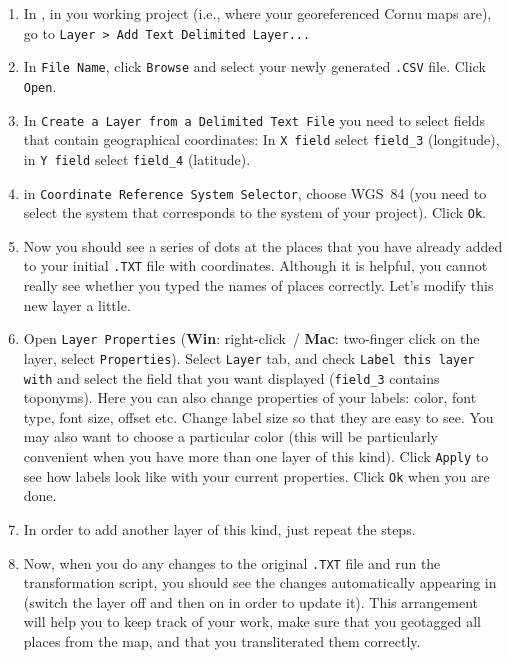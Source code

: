 \documentclass[12pt,oneside]{article}
\begin{document}
\begin{enumerate}

\item In \QGIS, in you working project (i.e., where your georeferenced Cornu maps are), go to \texttt{Layer > Add Text Delimited Layer...}

\item In \texttt{File Name}, click \texttt{Browse} and select your newly generated \texttt{.CSV} file. Click \texttt{Open}.

\item In \texttt{Create a Layer from a Delimited Text File} you need to select fields that contain geographical coordinates: In \texttt{X field} select \texttt{field\_3} (longitude), in \texttt{Y field} select \texttt{field\_4} (latitude).

\item in \texttt{Coordinate Reference System Selector}, choose WGS~84 (you need to select the system that corresponds to the system of your project). Click \texttt{Ok}.

\item Now you should see a series of dots at the places that you have already added to your initial \texttt{.TXT} file with coordinates. Although it is helpful, you cannot really see whether you typed the names of places correctly. Let's modify this new layer a little.

\item Open \texttt{Layer Properties} (\textbf{Win}: right-click~/ \textbf{Mac}: two-finger click on the layer, select \texttt{Properties}). Select \texttt{Layer} tab, and check \texttt{Label this layer with} and select the field that you want displayed (\texttt{field\_3} contains toponyms). Here you can also change properties of your labels: color, font type, font size, offset etc. Change label size so that they are easy to see. You may also want to choose a particular color (this will be particularly convenient when you have more than one layer of this kind). Click \texttt{Apply} to see how labels look like with your current properties. Click \texttt{Ok} when you are done.

\item In order to add another layer of this kind, just repeat the steps.

\item Now, when you do any changes to the original \texttt{.TXT} file and run the transformation script, you should see the changes automatically appearing in \QGIS (switch the layer off and then on in order to update it). This arrangement will help you to keep track of your work, make sure that you geotagged all places from the map, and that you transliterated them correctly.

\end{enumerate}
\end{document}
